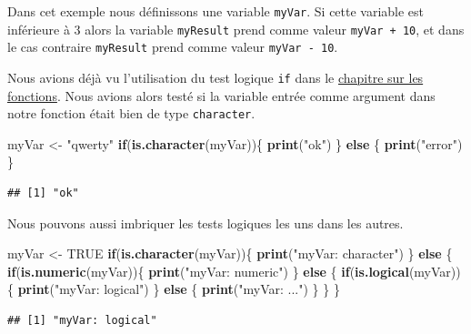 \documentclass[
]{book}
\newenvironment{Shaded}{\begin{snugshade}}{\end{snugshade}}
\newcommand{\ControlFlowTok}[1]{\textcolor[rgb]{0.13,0.29,0.53}{\textbf{#1}}}
\newcommand{\KeywordTok}[1]{\textcolor[rgb]{0.13,0.29,0.53}{\textbf{#1}}}
\newcommand{\NormalTok}[1]{#1}
\newcommand{\OtherTok}[1]{\textcolor[rgb]{0.56,0.35,0.01}{#1}}
\newcommand{\StringTok}[1]{\textcolor[rgb]{0.31,0.60,0.02}{#1}}
\begin{document}
Dans cet exemple nous définissons une variable \texttt{myVar}. Si cette variable est inférieure à 3 alors la variable \texttt{myResult} prend comme valeur \texttt{myVar\ +\ 10}, et dans le cas contraire \texttt{myResult} prend comme valeur \texttt{myVar\ -\ 10}.

Nous avions déjà vu l'utilisation du test logique \texttt{if} dans le \protect\hyperlink{l015function}{chapitre sur les fonctions}. Nous avions alors testé si la variable entrée comme argument dans notre fonction était bien de type \texttt{character}.

\begin{Shaded}
\begin{Highlighting}[]
\NormalTok{myVar <-}\StringTok{ "qwerty"}
\ControlFlowTok{if}\NormalTok{(}\KeywordTok{is.character}\NormalTok{(myVar))\{}
  \KeywordTok{print}\NormalTok{(}\StringTok{"ok"}\NormalTok{)}
\NormalTok{\} }\ControlFlowTok{else}\NormalTok{ \{}
  \KeywordTok{print}\NormalTok{(}\StringTok{"error"}\NormalTok{)}
\NormalTok{\}}
\end{Highlighting}
\end{Shaded}

\begin{verbatim}
## [1] "ok"
\end{verbatim}

Nous pouvons aussi imbriquer les tests logiques les uns dans les autres.

\begin{Shaded}
\begin{Highlighting}[]
\NormalTok{myVar <-}\StringTok{ }\OtherTok{TRUE}
\ControlFlowTok{if}\NormalTok{(}\KeywordTok{is.character}\NormalTok{(myVar))\{}
  \KeywordTok{print}\NormalTok{(}\StringTok{"myVar: character"}\NormalTok{)}
\NormalTok{\} }\ControlFlowTok{else}\NormalTok{ \{}
  \ControlFlowTok{if}\NormalTok{(}\KeywordTok{is.numeric}\NormalTok{(myVar))\{}
    \KeywordTok{print}\NormalTok{(}\StringTok{"myVar: numeric"}\NormalTok{)}
\NormalTok{  \} }\ControlFlowTok{else}\NormalTok{ \{}
    \ControlFlowTok{if}\NormalTok{(}\KeywordTok{is.logical}\NormalTok{(myVar))\{}
      \KeywordTok{print}\NormalTok{(}\StringTok{"myVar: logical"}\NormalTok{)}
\NormalTok{    \} }\ControlFlowTok{else}\NormalTok{ \{}
      \KeywordTok{print}\NormalTok{(}\StringTok{"myVar: ..."}\NormalTok{)}
\NormalTok{    \}}
\NormalTok{  \}}
\NormalTok{\}}
\end{Highlighting}
\end{Shaded}

\begin{verbatim}
## [1] "myVar: logical"
\end{verbatim}
\end{document}
